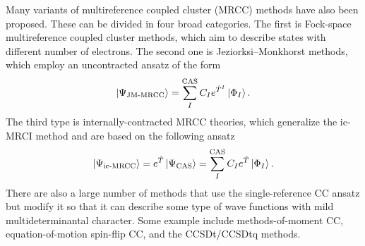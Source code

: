 \documentclass[../Main/chem532-notes.tex]{subfiles}
\begin{document}
Many variants of multireference coupled cluster (MRCC) methods have also been proposed.
These can be divided in four broad categories. The first is Fock-space multireference coupled cluster methods, which aim to describe states with different number of electrons.
The second one is Jeziorksi--Monkhorst methods, which employ an uncontracted ansatz of the form
\begin{equation}
\ket{\Psi_\text{JM-MRCC}}  = \sum_I^\mathrm{CAS} C_I e^{\hat{T}^I}\ket{\Phi_I}.
\end{equation}
The third type is internally-contracted MRCC theories, which generalize the ic-MRCI method and are based on the following ansatz
\begin{equation}
\ket{\Psi_\text{ic-MRCC}}  = e^{\hat{T}} \ket{\Psi_\mathrm{CAS}} 
= \sum_I^\mathrm{CAS} C_I e^{\hat{T}}\ket{\Phi_I}.
\end{equation}
There are also a large number of methods that use the single-reference CC ansatz but modify it so that it can describe some type of wave functions with mild multideterminantal character.
Some example include methods-of-moment CC, equation-of-motion spin-flip CC, and the CCSDt/CCSDtq methods.
\end{document}
